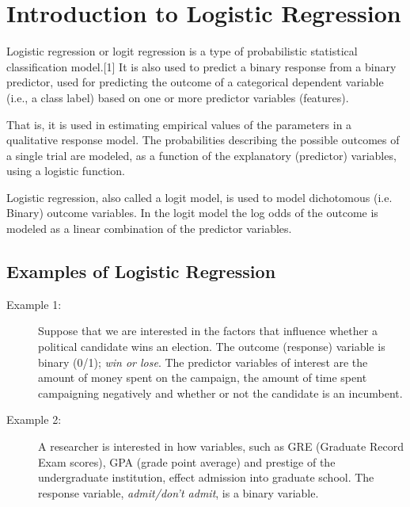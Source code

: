 \documentclass[]{article}
\begin{document}
\tableofcontents

\section{Introduction to Logistic Regression}
Logistic regression or logit regression is a type of probabilistic statistical classification model.[1] It is also used to predict a binary response from a binary predictor, used for predicting the outcome of a categorical dependent variable (i.e., a class label) based on one or more predictor variables (features). 

That is, it is used in estimating empirical values of the parameters in a qualitative response model. The probabilities describing the possible outcomes of a single trial are modeled, as a function of the explanatory (predictor) variables, using a logistic function. 

Logistic regression, also called a logit model, is used to model dichotomous (i.e. Binary) outcome variables. In the logit model the log odds of the outcome is modeled as a linear combination of the predictor variables.

\subsection{Examples of Logistic Regression}

\begin{description}
\item[Example 1:]  Suppose that we are interested in the factors that influence whether a political candidate wins an election.  The outcome (response) variable is binary (0/1); \textit{ win or lose}.  The predictor variables of interest are the amount of money spent on the campaign, the amount of time spent campaigning negatively and whether or not the candidate is an incumbent.

\item[Example 2:]  A researcher is interested in how variables, such as GRE (Graduate Record Exam scores), GPA (grade point average) and prestige of the undergraduate institution, effect admission into graduate school. The response variable, \textit{admit/don't admit}, is a binary variable.
\end{description}
\end{document}
